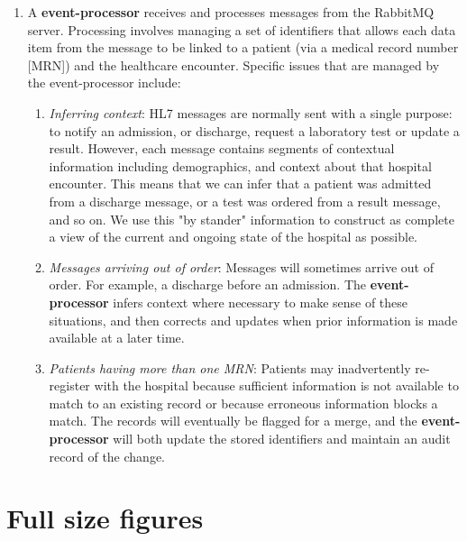 \documentclass[pmlr,twocolumn,10pt]{jmlr} %
\begin{document}
\begin{enumerate}
    \item A \textbf{event-processor} receives and processes messages from the RabbitMQ server. Processing involves managing a set of identifiers that allows each data item from the message to be linked to a patient (via a medical record number [MRN]) and the healthcare encounter. Specific issues that are managed by the event-processor include:
    \begin{enumerate}
        \item \textit{Inferring context}: HL7 messages are normally sent with a single purpose: to notify an admission, or discharge, request a laboratory test or update a result. However, each message contains segments of contextual information including demographics, and context about that hospital encounter. This means that we can infer that a patient was admitted from a discharge message, or a test was ordered from a result message, and so on. We use this "by stander" information to construct as complete a view of the current and ongoing state of the hospital as possible.
        \item \textit{Messages arriving out of order}: Messages will sometimes arrive out of order. For example, a discharge before an admission. The \textbf{event-processor} infers context where necessary to make sense of these situations, and then corrects and updates when prior information is made available at a later time.
        \item \textit{Patients having more than one MRN}: Patients may inadvertently re-register with the hospital because sufficient information is not available to match to an existing record or because erroneous information blocks a match. The records will eventually be flagged for a merge, and the \textbf{event-processor} will both update the stored identifiers and maintain an audit record of the change.
    \end{enumerate}
\end{enumerate}

\section{Full size figures}\label{apd:second}
\end{document}
